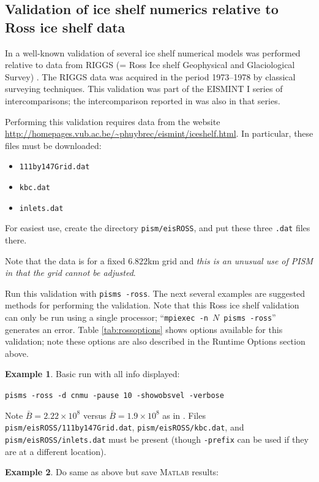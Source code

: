 \documentclass[11pt,final]{amsart}
\newcommand{\Matlab}{\textsc{Matlab}\xspace}
\begin{document}
\subsection{Validation of ice shelf numerics relative to Ross ice shelf data}  In \cite{MacAyealetal} a well-known validation of several ice shelf numerical models was performed relative to data from RIGGS (= Ross Ice shelf Geophysical and Glaciological Survey) \cite{RIGGS1,RIGGS2}.  The RIGGS data was acquired in the period 1973--1978 by classical surveying techniques.   This validation was part of the EISMINT I  series of intercomparisons; the intercomparison reported in \cite{EISMINT96} was also in that series.

Performing this validation requires data from the website \url{http://homepages.vub.ac.be/~phuybrec/eismint/iceshelf.html}.  In particular, these files must be downloaded:
\begin{itemize}
\item \verb|111by147Grid.dat|
\item \verb|kbc.dat|
\item \verb|inlets.dat|
\end{itemize}
For easiest use, create the directory \verb|pism/eisROSS|, and put these three \verb|.dat| files there.

Note that the data is for a fixed $6.822$km grid and \emph{this is an unusual use of PISM in that the grid cannot be adjusted}.

Run this validation with \verb|pisms -ross|.  The next several examples are suggested methods for performing the validation.  Note that this Ross ice shelf validation can only be run using a single processor; ``\verb|mpiexec -n |$N$\verb| pisms -ross|'' generates an error.  Table \ref{tab:rossoptions} shows options available for this validation; note these options are also described in the Runtime Options section above.

\bigskip
\noindent\textbf{Example 1}.  Basic run with all info displayed: 

\verb|pisms -ross -d cnmu -pause 10 -showobsvel -verbose|

\noindent Note $\bar B = 2.22 \times 10^8$ versus $\bar B = 1.9 \times 10^8$ as in \cite{MacAyealetal}.  Files \verb|pism/eisROSS/111by147Grid.dat|, \verb|pism/eisROSS/kbc.dat|, and \verb|pism/eisROSS/inlets.dat| must be present (though \verb|-prefix| can be used if they are at a different location).

\bigskip
\noindent\textbf{Example 2}.  Do same as above but save \Matlab results:
\end{document}

